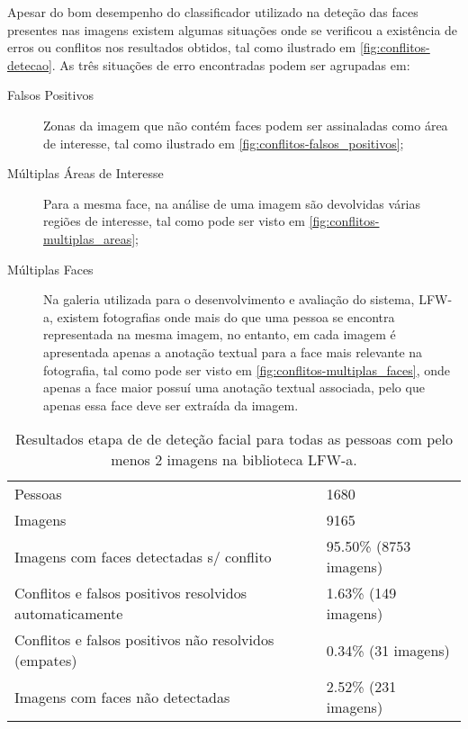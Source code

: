 Apesar do bom desempenho do classificador utilizado na deteção das faces presentes nas imagens existem algumas situações onde se verificou a existência de erros ou conflitos nos resultados obtidos, tal como ilustrado em \ref{fig:conflitos-detecao}. As três situações de erro encontradas podem ser agrupadas em:
\begin{description}
\item[Falsos Positivos] Zonas da imagem que não contém faces podem ser assinaladas como área de interesse, tal como ilustrado em \ref{fig:conflitos-falsos_positivos};
\item[Múltiplas Áreas de Interesse] Para a mesma face, na análise de uma imagem são devolvidas várias regiões de interesse, tal como pode ser visto em \ref{fig:conflitos-multiplas_areas};
\item[Múltiplas Faces] Na galeria utilizada para o desenvolvimento e avaliação do sistema, LFW-a, existem fotografias onde mais do que uma pessoa se encontra representada na mesma imagem, no entanto, em cada imagem é apresentada apenas a anotação textual para a face mais relevante na fotografia, tal como pode ser visto em \ref{fig:conflitos-multiplas_faces}, onde apenas a face maior possuí uma anotação textual associada, pelo que apenas essa face deve ser extraída da imagem.
\end{description}

\begin{table}
\caption{Resultados etapa de de deteção facial para todas as pessoas com pelo menos 2 imagens na biblioteca LFW-a.}
    \begin{tabular}{ll}
    \hline
    \hline
    Pessoas                                                 & 1680                   \\
    Imagens                                                 & 9165                   \\ \hline
    Imagens com faces detectadas s/ conflito                & 95.50\% (8753 imagens) \\
    Conflitos e falsos positivos resolvidos automaticamente & 1.63\% (149 imagens)   \\
    Conflitos e falsos positivos não resolvidos (empates)   & 0.34\% (31 imagens)    \\
    Imagens com faces não detectadas                        & 2.52\% (231 imagens)   \\
    \hline
    \hline
    \end{tabular}
    \label{tab:desempenho_detecao}
\end{table}

